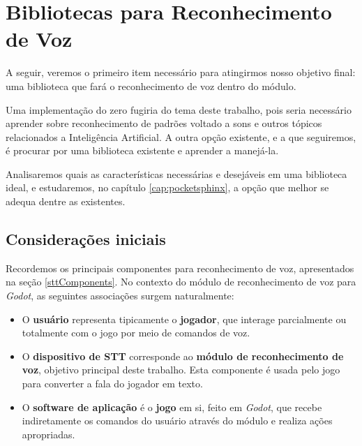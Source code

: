 \chapter{Bibliotecas para Reconhecimento de Voz}
\label{cap:speech-libs}

A seguir, veremos o primeiro item necessário para atingirmos nosso objetivo final: uma biblioteca que fará o reconhecimento de voz dentro do módulo.

Uma implementação do zero fugiria do tema deste trabalho, pois seria necessário aprender sobre reconhecimento de padrões voltado a sons e outros tópicos relacionados a Inteligência Artificial. A outra opção existente, e a que seguiremos, é procurar por uma biblioteca existente e aprender a manejá-la.

Analisaremos quais as características necessárias e desejáveis em uma biblioteca ideal, e estudaremos, no capítulo \ref{cap:pocketsphinx}, a opção que melhor se adequa dentre as existentes.


\section{Considerações iniciais}

Recordemos os principais componentes para reconhecimento de voz, apresentados na seção \ref{sttComponents}. No contexto do módulo de reconhecimento de voz para \textit{Godot}, as seguintes associações surgem naturalmente:

\begin{itemize}
\item O \textbf{usuário} representa tipicamente o \textbf{jogador}, que interage parcialmente ou totalmente com o jogo por meio de comandos de voz.

\item O \textbf{dispositivo de STT} corresponde ao \textbf{módulo de reconhecimento de voz}, objetivo principal deste trabalho. Esta componente é usada pelo jogo para converter a fala do jogador em texto.

\item O \textbf{software de aplicação} é o \textbf{jogo} em si, feito em \textit{Godot}, que recebe indiretamente os comandos do usuário através do módulo e realiza ações apropriadas.
\end{itemize}


